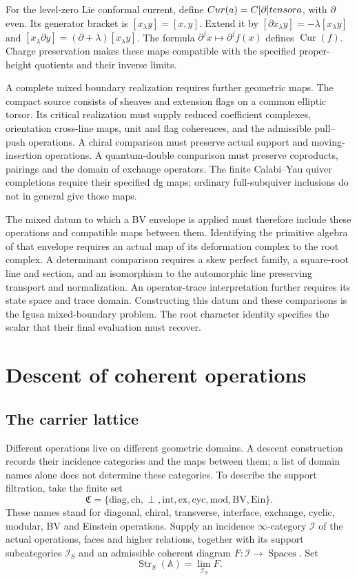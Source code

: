 For the level-zero Lie conformal current, define $Cur(a)=C[\partial]tensora$, with $\partial$ even. Its generator bracket is $[x_\lambda y]=[x,y]$. Extend it by $[\partial x_\lambda y]=-\lambda[x_\lambda y]$ and $[x_\lambda\partial y]=(\partial+\lambda)[x_\lambda y]$. The formula $\partial^j x\mapsto\partial^j f(x)$ defines $\operatorname{Cur}(f)$. Charge preservation makes these maps compatible with the specified proper-height quotients and their inverse limits.

A complete mixed boundary realization requires further geometric maps.
The compact source consists of sheaves and extension flags on a common
elliptic torsor. Its critical realization must supply reduced coefficient
complexes, orientation cross-line maps, unit and flag coherences, and the
admissible pull--push operations. A chiral comparison must preserve actual
support and moving-insertion operations. A quantum-double comparison must
preserve coproducts, pairings and the domain of exchange operators.
The finite Calabi--Yau quiver completions require their specified dg maps;
ordinary full-subquiver inclusions do not in general give those maps.

The mixed datum to which a BV envelope is applied must therefore include
these operations and compatible maps between them. Identifying the
primitive algebra of that envelope requires an actual map of its
deformation complex to the root complex. A determinant comparison requires
a skew perfect family, a square-root line and section, and an isomorphism
to the automorphic line preserving transport and normalization.
An operator-trace interpretation further requires its state space and
trace domain. Constructing this datum and these comparisons is the Igusa
mixed-boundary problem. The root character identity specifies the scalar
that their final evaluation must recover.

\chapter{Descent of coherent operations}

\section{The carrier lattice}
Different operations live on different geometric domains. A descent
construction records their incidence categories and the maps between them;
a list of domain names alone does not determine these categories.
To describe the support filtration, take the finite set
\[
 \mathfrak C=\{\mathrm{diag},\mathrm{ch},\perp,\mathrm{int},
              \mathrm{ex},\mathrm{cyc},\mathrm{mod},\mathrm{BV},\mathrm{Ein}\}.
\]
These names stand for diagonal, chiral, transverse, interface, exchange,
cyclic, modular, BV and Einstein operations. Supply an incidence
$\infty$-category $\mathcal I$ of the actual operations, faces and higher
relations, together with its support subcategories $\mathcal I_S$ and
an admissible coherent diagram $F:\mathcal I\to\operatorname{Spaces}$.
Set
\[
 \operatorname{Str}_S(\mathbb A)=\lim_{\mathcal I_S}F.
\]

